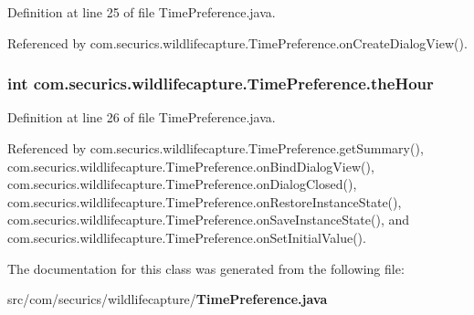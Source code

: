 Definition at line 25 of file Time\+Preference.\+java.



Referenced by com.\+securics.\+wildlifecapture.\+Time\+Preference.\+on\+Create\+Dialog\+View().

\subsubsection[{the\+Hour}]{\setlength{\rightskip}{0pt plus 5cm}int com.\+securics.\+wildlifecapture.\+Time\+Preference.\+the\+Hour\hspace{0.3cm}{\ttfamily [private]}}\label{classcom_1_1securics_1_1wildlifecapture_1_1_time_preference_aeead0024cc7795b4b0983a9bf2ed45d6}


Definition at line 26 of file Time\+Preference.\+java.



Referenced by com.\+securics.\+wildlifecapture.\+Time\+Preference.\+get\+Summary(), com.\+securics.\+wildlifecapture.\+Time\+Preference.\+on\+Bind\+Dialog\+View(), com.\+securics.\+wildlifecapture.\+Time\+Preference.\+on\+Dialog\+Closed(), com.\+securics.\+wildlifecapture.\+Time\+Preference.\+on\+Restore\+Instance\+State(), com.\+securics.\+wildlifecapture.\+Time\+Preference.\+on\+Save\+Instance\+State(), and com.\+securics.\+wildlifecapture.\+Time\+Preference.\+on\+Set\+Initial\+Value().



The documentation for this class was generated from the following file\+:\begin{DoxyCompactItemize}
\item 
src/com/securics/wildlifecapture/{\bf Time\+Preference.\+java}\end{DoxyCompactItemize}
